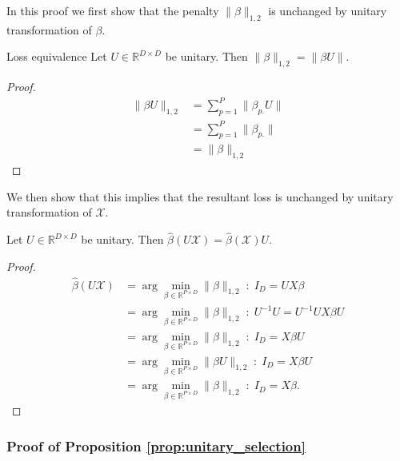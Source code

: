 In this proof we first show that the penalty $\|\beta\|_{1,2}$ is unchanged by unitary transformation of $\beta$.

 \begin{proposition}{Loss equivalence}
 \label{prop:basis_pursuit_loss_equivalence}
 Let $U \in \mathbb R^{D \times D}$ be unitary.
 Then $\|\beta\|_{1,2} = \|\beta U \|$.
\end{proposition}

\begin{proof}
\begin{align}
\|\beta U \|_{1,2} &= \sum_{p = 1}^P \| \beta_{p.} U \| \\
&= \sum_{p = 1}^P \| \beta_{p.} \| \\
&= \|\beta \|_{1,2}
\end{align}
\end{proof}

We then show that this implies that the resultant loss is unchanged by unitary transformation of $\mathcal X$.

\begin{proposition}
 \label{prop:basis_pursuit_loss_equivalence}
 Let $U \in \mathbb R^{D \times D}$ be unitary.
 Then $\widehat \beta  (U \mathcal X) = \widehat \beta  ( \mathcal X) U$.
\end{proposition}

\begin{proof}
\begin{align}
\widehat \beta  (U \mathcal X)  &= \arg \min_{\beta \in \mathbb R^{P \times D}} \|\beta\|_{1,2}  \; : \; I_{D} = U X \beta \\
&= \arg \min_{\beta \in \mathbb R^{P \times D}} \|\beta\|_{1,2}  \; : \; U^{-1} U = U^{-1} U X \beta U \\
&= \arg \min_{\beta \in \mathbb R^{P \times D}} \|\beta\|_{1,2}  \; : \;  I_D = X \beta U \\
&= \arg \min_{\beta \in \mathbb R^{P \times D}} \|\beta U \|_{1,2}  \; : \;  I_D = X \beta U \\
&= \arg \min_{\beta \in \mathbb R^{P \times D}} \|\beta \|_{1,2}  \; : \;  I_D = X \beta.
\end{align}
\end{proof}


\subsubsection{Proof of Proposition \ref{prop:unitary_selection}}
\label{sec:local_isometry_proof}

